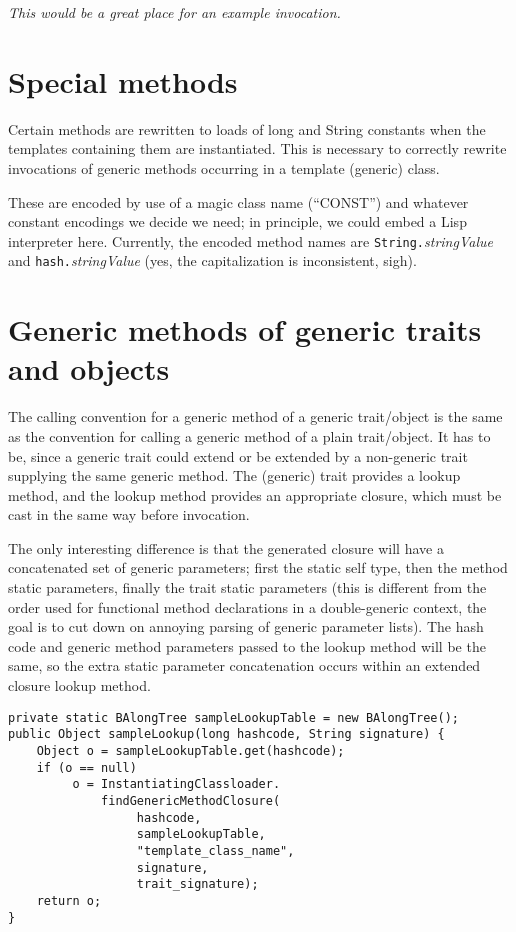 \documentclass[11pt]{article}
\begin{document}
{\it This would be a great place for an example invocation.}

\section{Special methods}

Certain methods are rewritten to loads of long and String constants when the templates containing them are instantiated.  This is necessary to correctly rewrite invocations of generic methods occurring in a template (generic) class.

These are encoded by use of a magic class name (``CONST'') and whatever constant encodings we decide we need; in principle, we could embed a Lisp interpreter here.  Currently, the encoded method names are \verb+String.+{\it stringValue} and \verb+hash.+{\it stringValue} (yes, the capitalization is inconsistent, sigh).

\section{Generic methods of generic traits and objects}

The calling convention for a generic method of a generic trait/object is the same as the convention for calling a generic method of a plain trait/object.  It has to be, since a generic trait could extend or be extended by a non-generic trait supplying the same generic method.  The (generic) trait provides a lookup method, and the lookup method provides an appropriate closure, which must be cast in the same way before invocation.

The only interesting difference is that the generated closure will have a concatenated set of generic parameters; first the static self type, then the method static parameters, finally the trait static parameters (this is different from the order used for functional method declarations in a double-generic context, the goal is to cut down on annoying parsing of generic parameter lists).  The hash code and generic method parameters passed to the lookup method will be the same, so the extra static parameter concatenation occurs within an extended closure lookup method.

\begin{verbatim}
private static BAlongTree sampleLookupTable = new BAlongTree();
public Object sampleLookup(long hashcode, String signature) {
    Object o = sampleLookupTable.get(hashcode);
    if (o == null) 
         o = InstantiatingClassloader.
             findGenericMethodClosure(
                  hashcode,
                  sampleLookupTable,
                  "template_class_name",
                  signature,
                  trait_signature);
    return o;
}
\end{verbatim}
\end{document}
